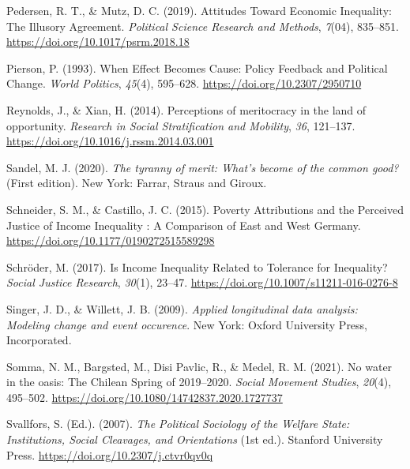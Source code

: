 \documentclass[
  12pt,
]{article}
\newlength{\cslhangindent}
\newenvironment{CSLReferences}[2] %
 {\begin{list}{}{%
  \setlength{\itemindent}{0pt}
  \setlength{\leftmargin}{0pt}
  \setlength{\parsep}{0pt}
  \ifodd #1
   \setlength{\leftmargin}{\cslhangindent}
   \setlength{\itemindent}{-1\cslhangindent}
  \fi
  \setlength{\itemsep}{#2\baselineskip}}}
 {\end{list}}
\begin{document}
\begin{CSLReferences}{1}{0}
Pedersen, R. T., \& Mutz, D. C. (2019). Attitudes {Toward Economic
Inequality}: {The Illusory Agreement}. \emph{Political Science Research
and Methods}, \emph{7}(04), 835--851.
\url{https://doi.org/10.1017/psrm.2018.18}

Pierson, P. (1993). When {Effect Becomes Cause}: {Policy Feedback} and
{Political Change}. \emph{World Politics}, \emph{45}(4), 595--628.
\url{https://doi.org/10.2307/2950710}

Reynolds, J., \& Xian, H. (2014). Perceptions of meritocracy in the land
of opportunity. \emph{Research in Social Stratification and Mobility},
\emph{36}, 121--137. \url{https://doi.org/10.1016/j.rssm.2014.03.001}

Sandel, M. J. (2020). \emph{The tyranny of merit: {What}'s become of the
common good?} (First edition). New York: {Farrar, Straus and Giroux}.

Schneider, S. M., \& Castillo, J. C. (2015). Poverty {Attributions} and
the {Perceived Justice} of {Income Inequality} : {A Comparison} of
{East} and {West Germany}.
\url{https://doi.org/10.1177/0190272515589298}

Schröder, M. (2017). Is {Income Inequality Related} to {Tolerance} for
{Inequality}? \emph{Social Justice Research}, \emph{30}(1), 23--47.
\url{https://doi.org/10.1007/s11211-016-0276-8}

Singer, J. D., \& Willett, J. B. (2009). \emph{Applied longitudinal data
analysis: Modeling change and event occurence}. New York: Oxford
University Press, Incorporated.

Somma, N. M., Bargsted, M., Disi Pavlic, R., \& Medel, R. M. (2021). No
water in the oasis: The {Chilean Spring} of 2019--2020. \emph{Social
Movement Studies}, \emph{20}(4), 495--502.
\url{https://doi.org/10.1080/14742837.2020.1727737}

Svallfors, S. (Ed.). (2007). \emph{The {Political Sociology} of the
{Welfare State}: {Institutions}, {Social Cleavages}, and {Orientations}}
(1st ed.). Stanford University Press.
\url{https://doi.org/10.2307/j.ctvr0qv0q}


\end{CSLReferences}
\end{document}
